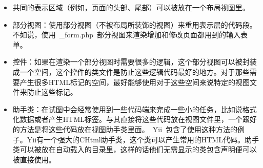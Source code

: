 \begin{itemize}
\item 共同的表示区域（例如，页面的头部、尾部）可以被放在一个布局视图里。
\item 部分视图：使用部分视图（不被布局所装饰的视图）来重用表示层的代码段。不如说，使用~\_form.php~部分视图来渲染增加和修改页面都用到的输入表单。

\item 控件：如果在渲染一个部分视图时需要很多的逻辑，这个部分视图可以被封装成一个空间，这个控件的类文件是防止这些逻辑代码最好的地方。对于那些需要产生很多HTML标记的空间，最好能够使用对于这些空间来说特定的视图文件来防止这些标记。

\item 助手类：在试图中会经常使用到一些代码端来完成一些小的任务，比如说格式化数据或者产生HTML标签。与其直接将这些代码放在视图文件里，一个跟好的方法是将这些代码放在视图助手类里面。~Yii~包含了使用这种方法的例子。Yii有一个强大的CHtml助手类，这个类可以产生常用的HTML代码。助手类可以被放在自动载入的目录里，这样的话他们无需显示的类包含声明便可以被直接使用。
\end{itemize}


